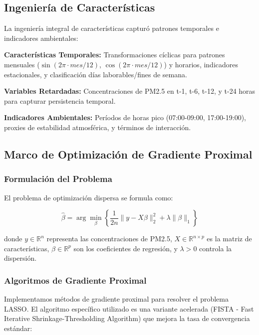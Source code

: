 \documentclass[conference]{IEEEtran}
\begin{document}
\subsection{Ingeniería de Características}

La ingeniería integral de características capturó patrones temporales e indicadores ambientales:

\textbf{Características Temporales:} Transformaciones cíclicas para patrones mensuales ($\sin(2\pi \cdot mes/12)$, $\cos(2\pi \cdot mes/12)$) y horarios, indicadores estacionales, y clasificación días laborables/fines de semana.

\textbf{Variables Retardadas:} Concentraciones de PM2.5 en t-1, t-6, t-12, y t-24 horas para capturar persistencia temporal.

\textbf{Indicadores Ambientales:} Períodos de horas pico (07:00-09:00, 17:00-19:00), proxies de estabilidad atmosférica, y términos de interacción.

\subsection{Marco de Optimización de Gradiente Proximal}

\subsubsection{Formulación del Problema}

El problema de optimización dispersa se formula como:

\begin{equation}
\hat{\beta} = \arg\min_{\beta} \left\{ \frac{1}{2n} \|y - X\beta\|_2^2 + \lambda \|\beta\|_1 \right\}
\end{equation}

donde $y \in \mathbb{R}^n$ representa las concentraciones de PM2.5, $X \in \mathbb{R}^{n \times p}$ es la matriz de características, $\beta \in \mathbb{R}^p$ son los coeficientes de regresión, y $\lambda > 0$ controla la dispersión.

\subsubsection{Algoritmos de Gradiente Proximal}

Implementamos métodos de gradiente proximal para resolver el problema LASSO. El algoritmo específico utilizado es una variante acelerada (FISTA - Fast Iterative Shrinkage-Thresholding Algorithm) que mejora la tasa de convergencia estándar:
\end{document}

